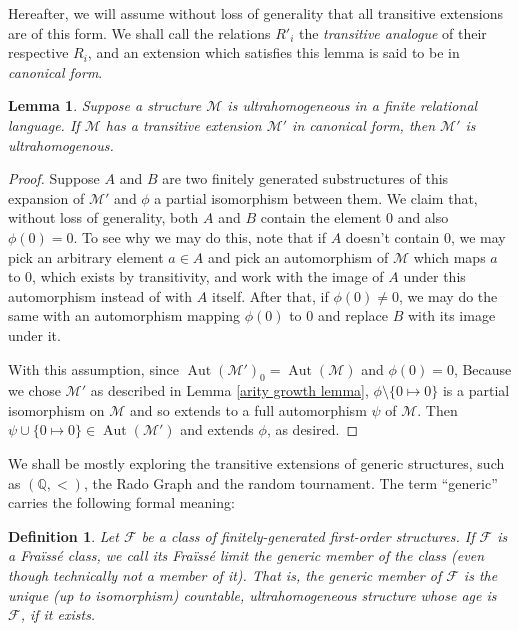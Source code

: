 \documentclass{amsart}
\newtheorem{lemma}[theorem]{Lemma}
\newtheorem{definition}[theorem]{Definition}
\newcommand{\set}[1]{\{#1 \}}
\newcommand{\model}{\mathcal{M}}
\DeclareMathOperator{\Aut}{Aut}
\begin{document}
Hereafter, we will assume without loss of generality that all transitive extensions are of this form. We shall call the relations $R'_i$ the \emph{transitive analogue} of their respective $R_i$, and an extension which satisfies this lemma is said to be in \emph{canonical form}.

\begin{lemma}\label{Extensions of homogeneous structures}
    Suppose a structure $\model$ is ultrahomogeneous in a finite relational language. If $\model$ has a transitive extension $\model'$ in canonical form, then $\model'$ is ultrahomogenous.
\end{lemma}
\begin{proof}
    Suppose $A$ and $B$ are two finitely generated substructures of this expansion of $\model'$ and $\phi$ a partial isomorphism between them. We claim that, without loss of generality, both $A$ and $B$ contain the element 0 and also $\phi(0) = 0$. To see why we may do this, note that if $A$ doesn't contain $0$, we may pick an arbitrary element $a \in A$ and pick an automorphism of $\mathcal{M}$ which maps $a$ to $0$, which exists by transitivity, and work with the image of $A$ under this automorphism instead of with $A$ itself. After that, if $\phi(0) \neq 0$, we may do the same with an automorphism mapping $\phi(0)$ to 0 and replace $B$ with its image under it.

    With this assumption, since $\Aut(\model ')_0 = \Aut (\model)$ and $\phi(0) = 0$, Because we chose $\model'$ as described in Lemma \ref{arity growth lemma}, $\phi\setminus\set{0 \mapsto 0}$ is a partial isomorphism on $\model$ and so extends to a full automorphism $\psi$ of $\model$. Then $\psi \cup\set{0 \mapsto 0} \in \Aut(\model')$ and extends $\phi$, as desired. 
\end{proof}


We shall be mostly exploring the transitive extensions of generic structures, such as $(\mathbb{Q}, <)$, the Rado Graph and the random tournament. The term ``generic'' carries the following formal meaning:

\begin{definition}
    Let $\mathcal{F}$ be a class of finitely-generated first-order structures. If $\mathcal{F}$ is a Fraïssé class, we call its Fraïssé limit the generic member of the class (even though technically not a member of it). That is, the generic member of $\mathcal{F}$ is the unique (up to isomorphism) countable, ultrahomogeneous structure whose age is $\mathcal{F}$, if it exists.
\end{definition}
\end{document}
